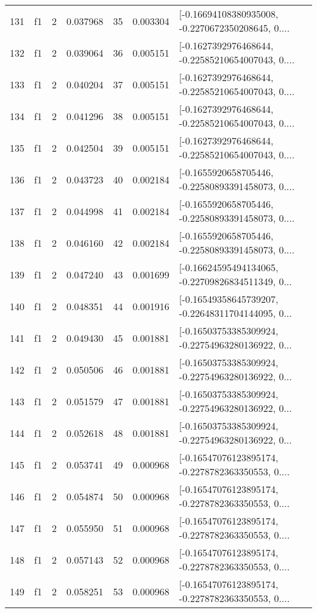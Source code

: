 \begin{tabular}{lllrlrl}
131 &  f1 &   2 &  0.037968 &   35 &  0.003304 &  [-0.16694108380935008, -0.2270672350208645, 0.... \\
132 &  f1 &   2 &  0.039064 &   36 &  0.005151 &  [-0.1627392976468644, -0.22585210654007043, 0.... \\
133 &  f1 &   2 &  0.040204 &   37 &  0.005151 &  [-0.1627392976468644, -0.22585210654007043, 0.... \\
134 &  f1 &   2 &  0.041296 &   38 &  0.005151 &  [-0.1627392976468644, -0.22585210654007043, 0.... \\
135 &  f1 &   2 &  0.042504 &   39 &  0.005151 &  [-0.1627392976468644, -0.22585210654007043, 0.... \\
136 &  f1 &   2 &  0.043723 &   40 &  0.002184 &  [-0.1655920658705446, -0.22580893391458073, 0.... \\
137 &  f1 &   2 &  0.044998 &   41 &  0.002184 &  [-0.1655920658705446, -0.22580893391458073, 0.... \\
138 &  f1 &   2 &  0.046160 &   42 &  0.002184 &  [-0.1655920658705446, -0.22580893391458073, 0.... \\
139 &  f1 &   2 &  0.047240 &   43 &  0.001699 &  [-0.16624595494134065, -0.22709826834511349, 0... \\
140 &  f1 &   2 &  0.048351 &   44 &  0.001916 &  [-0.16549358645739207, -0.22648311704144095, 0... \\
141 &  f1 &   2 &  0.049430 &   45 &  0.001881 &  [-0.16503753385309924, -0.22754963280136922, 0... \\
142 &  f1 &   2 &  0.050506 &   46 &  0.001881 &  [-0.16503753385309924, -0.22754963280136922, 0... \\
143 &  f1 &   2 &  0.051579 &   47 &  0.001881 &  [-0.16503753385309924, -0.22754963280136922, 0... \\
144 &  f1 &   2 &  0.052618 &   48 &  0.001881 &  [-0.16503753385309924, -0.22754963280136922, 0... \\
145 &  f1 &   2 &  0.053741 &   49 &  0.000968 &  [-0.16547076123895174, -0.2278782363350553, 0.... \\
146 &  f1 &   2 &  0.054874 &   50 &  0.000968 &  [-0.16547076123895174, -0.2278782363350553, 0.... \\
147 &  f1 &   2 &  0.055950 &   51 &  0.000968 &  [-0.16547076123895174, -0.2278782363350553, 0.... \\
148 &  f1 &   2 &  0.057143 &   52 &  0.000968 &  [-0.16547076123895174, -0.2278782363350553, 0.... \\
149 &  f1 &   2 &  0.058251 &   53 &  0.000968 &  [-0.16547076123895174, -0.2278782363350553, 0.... \\

\end{tabular}
